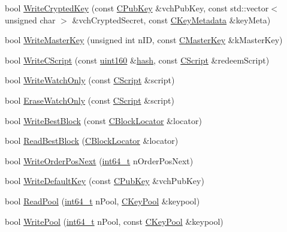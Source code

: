 \begin{DoxyCompactItemize}
\item 
bool \hyperlink{class_c_wallet_d_b_a914fb53d1731daf9b486f164dd325210}{Write\+Crypted\+Key} (const \hyperlink{class_c_pub_key}{C\+Pub\+Key} \&vch\+Pub\+Key, const std\+::vector$<$ unsigned char $>$ \&vch\+Crypted\+Secret, const \hyperlink{class_c_key_metadata}{C\+Key\+Metadata} \&key\+Meta)
\item 
bool \hyperlink{class_c_wallet_d_b_a507690da431ef61244941ad39c308aeb}{Write\+Master\+Key} (unsigned int n\+I\+D, const \hyperlink{class_c_master_key}{C\+Master\+Key} \&k\+Master\+Key)
\item 
bool \hyperlink{class_c_wallet_d_b_a8c69e48e2305775898658e0a4f4616c9}{Write\+C\+Script} (const \hyperlink{classuint160}{uint160} \&\hyperlink{cache_8cc_a11ecb029164e055f28f4123ce3748862}{hash}, const \hyperlink{class_c_script}{C\+Script} \&redeem\+Script)
\item 
bool \hyperlink{class_c_wallet_d_b_a05e5a277f66010d12071a5d72cb4dfb0}{Write\+Watch\+Only} (const \hyperlink{class_c_script}{C\+Script} \&script)
\item 
bool \hyperlink{class_c_wallet_d_b_ad6e63f550853905fcd67ec9e7c3bef8b}{Erase\+Watch\+Only} (const \hyperlink{class_c_script}{C\+Script} \&script)
\item 
bool \hyperlink{class_c_wallet_d_b_a5660d366fee16ab81f3e7d3a97892486}{Write\+Best\+Block} (const \hyperlink{class_c_block_locator}{C\+Block\+Locator} \&locator)
\item 
bool \hyperlink{class_c_wallet_d_b_a20eecdac6605607ff7cba2f55ec86f73}{Read\+Best\+Block} (\hyperlink{class_c_block_locator}{C\+Block\+Locator} \&locator)
\item 
bool \hyperlink{class_c_wallet_d_b_a6a1f671e6376b38a1f73c8a023abdd38}{Write\+Order\+Pos\+Next} (\hyperlink{stdint_8h_adec1df1b8b51cb32b77e5b86fff46471}{int64\+\_\+t} n\+Order\+Pos\+Next)
\item 
bool \hyperlink{class_c_wallet_d_b_a1d925af18104900bddd19c968a0402b5}{Write\+Default\+Key} (const \hyperlink{class_c_pub_key}{C\+Pub\+Key} \&vch\+Pub\+Key)
\item 
bool \hyperlink{class_c_wallet_d_b_a6a03927cf247314ccd9b285139de0bd1}{Read\+Pool} (\hyperlink{stdint_8h_adec1df1b8b51cb32b77e5b86fff46471}{int64\+\_\+t} n\+Pool, \hyperlink{class_c_key_pool}{C\+Key\+Pool} \&keypool)
\item 
bool \hyperlink{class_c_wallet_d_b_ad43630ad28a68c3e8b1a633f09aa0964}{Write\+Pool} (\hyperlink{stdint_8h_adec1df1b8b51cb32b77e5b86fff46471}{int64\+\_\+t} n\+Pool, const \hyperlink{class_c_key_pool}{C\+Key\+Pool} \&keypool)

\end{DoxyCompactItemize}
